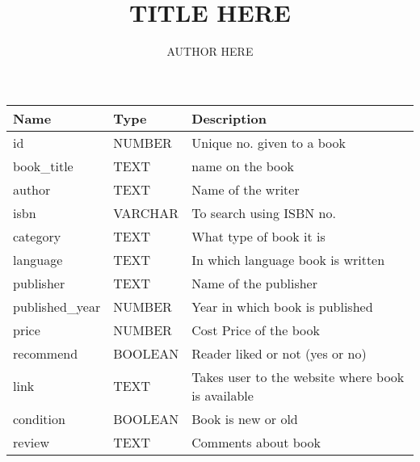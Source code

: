 \documentclass[10pt,a4paper]{article}
\title{TITLE HERE}
\author{AUTHOR HERE}
\begin{document}
\maketitle

\begin{tabularx}{\textwidth}{llX}
\toprule
\textbf{Name} & \textbf{Type} & \textbf{Description}\\
\midrule
id & NUMBER & Unique no. given to a book\\
book\_title & TEXT & name on the book\\
author & TEXT & Name of the writer\\
isbn & VARCHAR & To search using ISBN no.\\
category & TEXT & What type of book it is\\
language & TEXT & In which language book is written\\
publisher & TEXT & Name of the publisher\\
published\_year & NUMBER & Year in which book is published\\
price & NUMBER & Cost Price of the book\\
recommend & BOOLEAN & Reader liked or not (yes or no)\\
link & TEXT & Takes user to the website where book is available\\
condition & BOOLEAN & Book is new or old\\
review & TEXT & Comments about book\\
\bottomrule
\end{tabularx}
\end{document}
